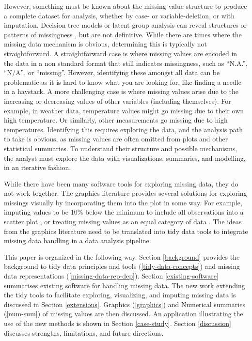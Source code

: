 \documentclass[
]{jss}
\begin{document}
However, something must be known about the missing value structure to produce a complete dataset for analysis, whether by case- or variable-deletion, or with imputation. Decision tree models or latent group analysis can reveal structures or patterns of missingness \citep{Tierney2015, Barnett2017}, but are not definitive. While there are times where the missing data mechanism is obvious, determining this is typically not straightforward. A straightforward case is where missing values are encoded in the data in a non standard format that still indicates missingness, such as ``N.A.'', ``N/A'', or ``missing''. However, identifying these amongst all data can be problematic as it is hard to know what you are looking for, like finding a needle in a haystack. A more challenging case is where missing values arise due to the increasing or decreasing values of other variables (including themselves). For example, in weather data, temperature values might go missing due to their own high temperature. Or similarly, other measurements go missing due to high temperatures. Identifying this requires exploring the data, and the analysis path to take is obvious, as missing values are often omitted from plots and other statistical summaries. To understand their structure and possible mechanisms, the analyst must explore the data with visualizations, summaries, and modelling, in an iterative fashion.

While there have been many software tools for exploring missing data, they do not work together. The graphics literature provides several solutions for exploring missings visually by incorporating them into the plot in some way. For example, imputing values to be 10\% below the minimum to include all observations into a scatter plot \citep{Cook2007}, or treating missing values as an equal category of data \citep{Unwin1996}. The ideas from the graphics literature need to be translated into tidy data tools to integrate missing data handling in a data analysis pipeline.

This paper is organized in the following way. Section \ref{background} provides the background to tidy data principles and tools (\ref{tidy-data-concepts}) and missing data representations (\ref{missing-data-rep-dep}). Section \ref{existing-software} summarises existing software for handling missing data. The new work extending the tidy tools to facilitate exploring, visualizing, and imputing missing data is discussed in Section \ref{extensions}. Graphics (\ref{graphics}) and Numerical summaries (\ref{num-sum}) of missing values are then discussed. An application illustrating the use of the new methods is shown in Section \ref{case-study}. Section \ref{discussion} discusses strengths, limitations, and future directions.
\end{document}
